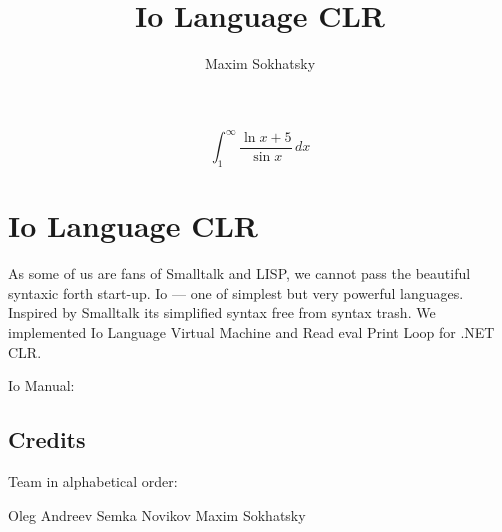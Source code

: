 \documentclass[11pt]{article}
\begin{document}


\title{Io Language CLR}
\author{Maxim Sokhatsky}

\paragraph{}
\paragraph{}
\begin{displaymath}
\int_1^\infty{\frac{\ln{x}+5}{\sin{x}}}\,dx
\end{displaymath}
\section*{Io Language CLR}

As some of us are fans of Smalltalk and LISP, we cannot pass the 
beautiful syntaxic forth start-up. Io --- one of simplest but very powerful
languages. Inspired by Smalltalk its simplified syntax free from
syntax trash. We implemented Io Language Virtual Machine and Read
eval Print Loop for .NET CLR.

Io Manual: 

\subsection*{Credits}

Team in alphabetical order:

Oleg Andreev \@br
Semka Novikov \@br
Maxim Sokhatsky                                                                                                   
\end{document}
